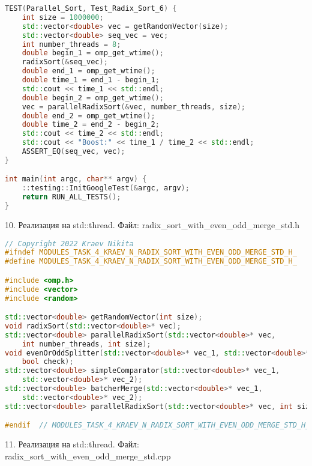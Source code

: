 \documentclass{report}
\begin{document}
\begin{lstlisting}[language=C++]
TEST(Parallel_Sort, Test_Radix_Sort_6) {
    int size = 1000000;
    std::vector<double> vec = getRandomVector(size);
    std::vector<double> seq_vec = vec;
    int number_threads = 8;
    double begin_1 = omp_get_wtime();
    radixSort(&seq_vec);
    double end_1 = omp_get_wtime();
    double time_1 = end_1 - begin_1;
    std::cout << time_1 << std::endl;
    double begin_2 = omp_get_wtime();
    vec = parallelRadixSort(&vec, number_threads, size);
    double end_2 = omp_get_wtime();
    double time_2 = end_2 - begin_2;
    std::cout << time_2 << std::endl;
    std::cout << "Boost:" << time_1 / time_2 << std::endl;
    ASSERT_EQ(seq_vec, vec);
}

int main(int argc, char** argv) {
    ::testing::InitGoogleTest(&argc, argv);
    return RUN_ALL_TESTS();
}
\end{lstlisting}

\par 10. Реализация на std::thread. Файл: radix\_sort\_with\_even\_odd\_merge\_std.h

\begin{lstlisting}[language=C++]
// Copyright 2022 Kraev Nikita
#ifndef MODULES_TASK_4_KRAEV_N_RADIX_SORT_WITH_EVEN_ODD_MERGE_STD_H_
#define MODULES_TASK_4_KRAEV_N_RADIX_SORT_WITH_EVEN_ODD_MERGE_STD_H_

#include <omp.h>
#include <vector>
#include <random>

std::vector<double> getRandomVector(int size);
void radixSort(std::vector<double>* vec);
std::vector<double> parallelRadixSort(std::vector<double>* vec,
    int number_threads, int size);
void evenOrOddSplitter(std::vector<double>* vec_1, std::vector<double>* vec_2,
    bool check);
std::vector<double> simpleComparator(std::vector<double>* vec_1,
    std::vector<double>* vec_2);
std::vector<double> batcherMerge(std::vector<double>* vec_1,
    std::vector<double>* vec_2);
std::vector<double> parallelRadixSort(std::vector<double>* vec, int size);

#endif  // MODULES_TASK_4_KRAEV_N_RADIX_SORT_WITH_EVEN_ODD_MERGE_STD_H_
\end{lstlisting}

\par 11. Реализация на std::thread. Файл: radix\_sort\_with\_even\_odd\_merge\_std.cpp
\end{document}
